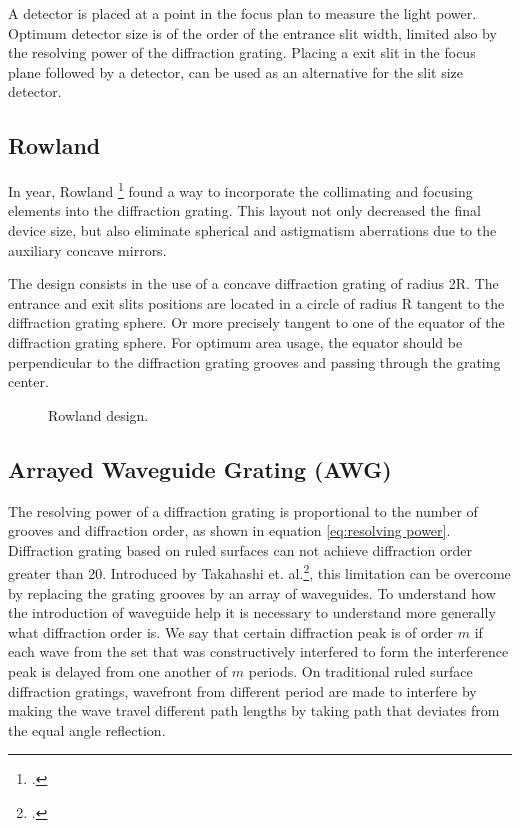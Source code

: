 \documentclass[12pt,twoside,english]{book}
\renewcommand{\~}{\perispomeni}%
\numberwithin{equation}{section}
\numberwithin{figure}{section}
\begin{document}
A detector is placed at a point in the focus plan to measure the light power. Optimum detector size is of the order of the entrance slit width, limited also by the resolving power of the diffraction grating. Placing a exit slit in the focus plane followed by a detector, can be used as an alternative for the slit size detector. 

\subsection{Rowland\label{sub:Rowland}}

In year, Rowland \footcite{Rowland:1883p38} found a way to incorporate the collimating and focusing elements into the diffraction grating. This layout not only decreased the final device size, but also eliminate spherical and astigmatism aberrations due to the auxiliary concave mirrors.

The design consists in the use of a concave diffraction grating of radius 2R. The entrance and exit slits positions are located in a circle of radius R tangent to the diffraction grating sphere. Or more precisely tangent to one of the equator of the diffraction grating sphere. For optimum area usage, the equator should be perpendicular to the diffraction grating grooves and passing through the grating center.

%
\begin{figure}[h]
\center{}
\caption{Rowland design.}
\end{figure}



\subsection{Arrayed Waveguide Grating (AWG)}

The resolving power of a diffraction grating is proportional to the number of grooves and diffraction order, as shown in equation \ref{eq:resolving power}. Diffraction grating based on ruled surfaces can not achieve diffraction order greater than 20. Introduced by Takahashi et. al.\footcite{Takahashi:1990p122}, this limitation can be overcome by replacing the grating grooves by an array of waveguides. To understand how the introduction of waveguide help it is necessary to understand more generally what diffraction order is. We say that certain diffraction peak is of order $m$ if each wave from the set that was constructively interfered to form the interference peak is delayed from one another of $m$ periods. On traditional ruled surface diffraction gratings, wavefront from different period are made to interfere by making the wave travel different path lengths by taking path that deviates from the equal angle reflection.
\end{document}
